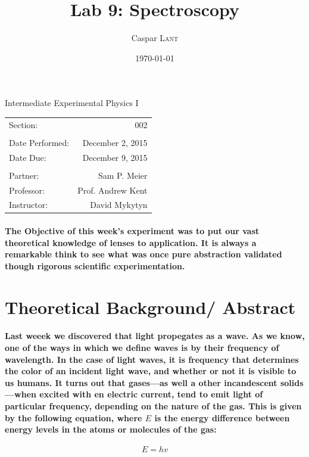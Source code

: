 \documentclass[11.8pt]{amsart}
\title{Lab 9: Spectroscopy}
\author{Caspar \textsc{Lant}} %
\date{\today} %
\begin{document}
\bigskip

\maketitle %
\begin{center}

Intermediate Experimental Physics I\\
\vspace{1.5cm}

\begin{tabular}{l r}

Section: & 002\\
\\
Date Performed: & December 2, 2015 \\ %
Date Due: & December 9, 2015\\
\\
Partner: & Sam P. Meier \\ %
Professor: & Prof. Andrew Kent\\
Instructor: & David Mykytyn %
\end{tabular}
\end{center}
\vspace{50mm}
\pagebreak

\paragraph{\textbf{The Objective} of this week's experiment was to put our vast theoretical knowledge of lenses to application. It is always a remarkable think to see what was once pure abstraction validated though rigorous scientific experimentation. }

\section{Theoretical Background/ Abstract}
\paragraph{Last weeek we discovered that light propegates as a wave. As we know, one of the ways in which we define waves is by their frequency of wavelength. In the case of light waves, it is frequency that determines the color of an incident light wave, and whether or not it is visible to us humans. It turns out that gases---as well a other incandescent solids---when excited with en electric current, tend to emit light of particular frequency, depending on the nature of the gas. This is given by the following equation, where $E$ is the energy difference between energy levels in the atoms or molecules of the gas:}
\begin{equation}
E = hv
\end{equation}
\end{document}
